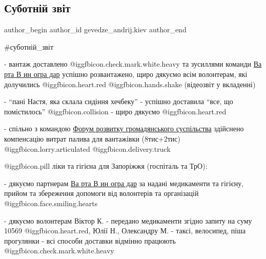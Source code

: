  
 
 
 
 
 
\subsection{Суботній звіт}
\label{sec:01_05_2022.fb.gevedze_andrij.kiev.1.subotnij_zvit}
 
\ifcmt
 author_begin
   author_id gevedze_andrij.kiev
 author_end
\fi


\#суботній\_звіт

- вантаж доставлено  @igg{fbicon.check.mark.white.heavy}  та зусиллями команди
\href{https://www.facebook.com/groups/vartavynohradar/}{Ва рта В ин огра дар}
успішно розвантажено, щиро дякуємо всім волонтерам, які долучились
@igg{fbicon.heart.red} @igg{fbicon.hands.shake}  (відеозвіт у вкладенні)

- \enquote{пані Настя, яка склала сидіння хечбеку} - успішно доставила \enquote{все, що
помістилось}  @igg{fbicon.collision} - щиро дякуємо @igg{fbicon.heart.red}

- спільно з командою \href{https://www.facebook.com/csdf.ua/}{Форум розвитку громадянського суспільства} здійснено
компенсацію витрат палива для вантажівки (8тис+2тис)  @igg{fbicon.lorry.articulated}  @igg{fbicon.delivery.truck} 

 @igg{fbicon.pill}  ліки та гігієна для Запоріжжя (госпіталь та ТрО): 

- дякуємо партнерам \href{https://www.facebook.com/groups/vartavynohradar/}{Ва
рта В ин огра дар} за надані медикаменти та гігієну, прийом та збереження
допомоги від волонтерів та організацій  @igg{fbicon.face.smiling.hearts} 

- дякуємо волонтерам Віктор К. - передано медикаменти згідно запиту на суму
10569 @igg{fbicon.heart.red}, Юлії Н., Олександру М. - таксі, велосипед, піша прогулянки - всі
способи доставки відмінно працюють  @igg{fbicon.check.mark.white.heavy} 

